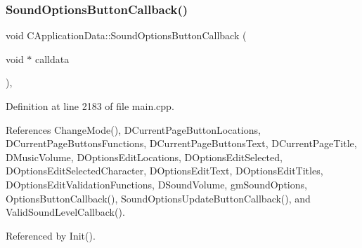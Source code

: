 \subsubsection{\texorpdfstring{Sound\+Options\+Button\+Callback()}{SoundOptionsButtonCallback()}}
{\footnotesize\ttfamily void C\+Application\+Data\+::\+Sound\+Options\+Button\+Callback (\begin{DoxyParamCaption}\item[{void $\ast$}]{calldata }\end{DoxyParamCaption})\hspace{0.3cm}{\ttfamily [static]}, {\ttfamily [protected]}}



Definition at line 2183 of file main.\+cpp.



References Change\+Mode(), D\+Current\+Page\+Button\+Locations, D\+Current\+Page\+Buttons\+Functions, D\+Current\+Page\+Buttons\+Text, D\+Current\+Page\+Title, D\+Music\+Volume, D\+Options\+Edit\+Locations, D\+Options\+Edit\+Selected, D\+Options\+Edit\+Selected\+Character, D\+Options\+Edit\+Text, D\+Options\+Edit\+Titles, D\+Options\+Edit\+Validation\+Functions, D\+Sound\+Volume, gm\+Sound\+Options, Options\+Button\+Callback(), Sound\+Options\+Update\+Button\+Callback(), and Valid\+Sound\+Level\+Callback().



Referenced by Init().


